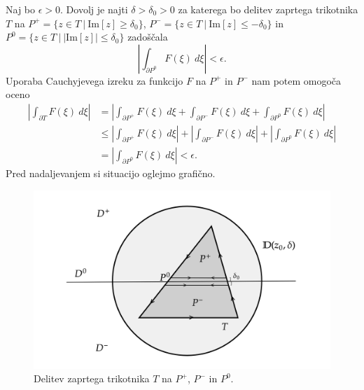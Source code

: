 \documentclass[mat1, tisk]{fmfdelo}
\begin{document}
\begin{dokaz}
        Naj bo $\epsilon > 0$. Dovolj je najti $\delta > \delta_0 > 0$ za katerega bo delitev zaprtega trikotnika $T$ na $P^+ = \{z \in T~|~\text{Im}[z] \geq \delta_0\}$, $P^- = \{z \in T~|~\text{Im}[z] \leq -\delta_0\}$ in $P^0 = \{z \in T~|~|\text{Im}[z]| \leq \delta_0\}$ zadoščala
        $$ 
            \left|\int_{\partial P^0}{F(\xi)~d\xi}\right| < \epsilon.
        $$
        Uporaba Cauchyjevega izreku za funkcijo $F$ na $P^+$ in $P^-$ nam potem omogoča oceno
        \begin{align*}
            \left|\int_{\partial T}{F(\xi)~d\xi}\right| &= \left|\int_{\partial P^+}{F(\xi)~d\xi} + \int_{\partial P^-}{F(\xi)~d\xi} + \int_{\partial P^0}{F(\xi)~d\xi}\right|\\
            &\leq \left|\int_{\partial P^+}{F(\xi)~d\xi} \right|+ \left|\int_{\partial P^-}{F(\xi)~d\xi}\right| + \left|\int_{\partial P^0}{F(\xi)~d\xi}\right| \\ 
            & =\left|\int_{\partial P^0}{F(\xi)~d\xi} \right| < \epsilon.
        \end{align*}
        Pred nadaljevanjem si situacijo oglejmo grafično.
        \begin{figure}[H]
            \begin{center}
                \includegraphics[width = \textwidth]{schwarz_hol_2.png}
                \caption{Delitev zaprtega trikotnika $T$ na $P^+$, $P^-$ in $P^0$.}
            \end{center}    
        \end{figure}


\end{dokaz}
\end{document}
